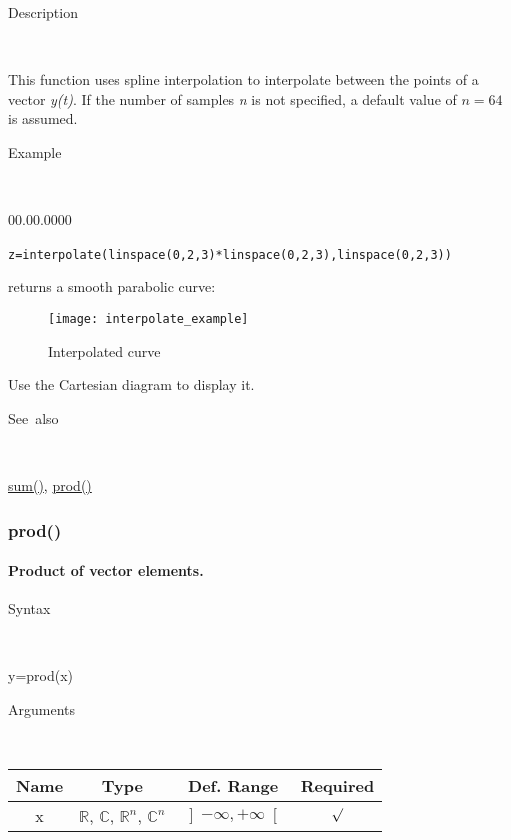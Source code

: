 \begin{description}
\item [Description]~
\end{description}
This function uses spline interpolation to interpolate between the
points of a vector \textit{y(t)}. If the number of samples \textit{n}
is not specified, a default value of $n=64$ is assumed.

\begin{description}
\item [Example]~
\end{description}
\begin{lyxlist}{00.00.0000}
\item [\texttt{z=interpolate(linspace(0,2,3){*}linspace(0,2,3),linspace(0,2,3))}]~
\end{lyxlist}
returns a smooth parabolic curve:

%
\begin{figure}[ht]
\begin{center}\texttt{[image: interpolate\_example]}\end{center}


\caption{Interpolated curve}
\end{figure}


Use the Cartesian diagram to display it.

\begin{description}
\item [See~also]~
\end{description}
\textcolor{blue}{\hyperlink{sum}{sum()}}\textcolor{black}{,} \textcolor{blue}{\hyperlink{prod}{prod()}}


\newpage
\subsubsection*{\hypertarget{prod}{}{\Large prod()}}


\paragraph{\label{par:Prod}Product of vector elements.}

\begin{description}
\item [Syntax]~
\end{description}
y=prod(x)

\begin{description}
\item [Arguments]~
\end{description}
\begin{tabular}{|c|c|c|c|}
\hline 
Name&
Type&
Def. Range&
Required\tabularnewline
\hline
\hline 
x&
$\mathbb{R}$, $\mathbb{C}$, $\mathbb{R}^{n}$, $\mathbb{C}^{n}$&
$\left]-\infty,+\infty\right[$&
$\surd$\tabularnewline
\hline
\end{tabular}

